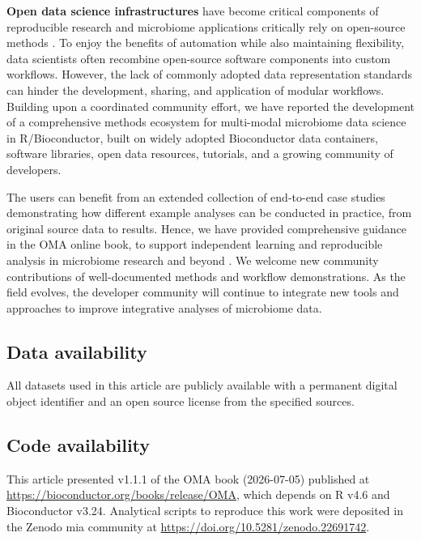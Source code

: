 \documentclass[
  sn-nature,
]{sn-jnl}
\begin{document}
\textbf{Open data science infrastructures} have become critical
components of reproducible research and microbiome applications
critically rely on open-source methods
\citep{berg2020, barker2022, hocquet2024}. To enjoy the benefits of
automation while also maintaining flexibility, data scientists often
recombine open-source software components into custom workflows.
However, the lack of commonly adopted data representation standards can
hinder the development, sharing, and application of modular workflows.
Building upon a coordinated community effort, we have reported the
development of a comprehensive methods ecosystem for multi-modal
microbiome data science in R/Bioconductor, built on widely adopted
Bioconductor data containers, software libraries, open data resources,
tutorials, and a growing community of developers.

The users can benefit from an extended collection of end-to-end case
studies demonstrating how different example analyses can be conducted in
practice, from original source data to results. Hence, we have provided
comprehensive guidance in the OMA online book, to support independent
learning and reproducible analysis in microbiome research and beyond
\citep{timmis2024, drnevich2025}. We welcome new community contributions
of well-documented methods and workflow demonstrations. As the field
evolves, the developer community will continue to integrate new tools
and approaches to improve integrative analyses of microbiome data.

\subsection{Data availability}\label{data-availability}

All datasets used in this article are publicly available with a
permanent digital object identifier and an open source license from the
specified sources.

\subsection{Code availability}\label{code-availability}

This article presented v1.1.1 of the OMA book (2026-07-05) published at
\url{https://bioconductor.org/books/release/OMA}, which depends on R
v4.6 and Bioconductor v3.24. Analytical scripts to reproduce this work
were deposited in the Zenodo mia community at
\url{https://doi.org/10.5281/zenodo.22691742}.
\end{document}
